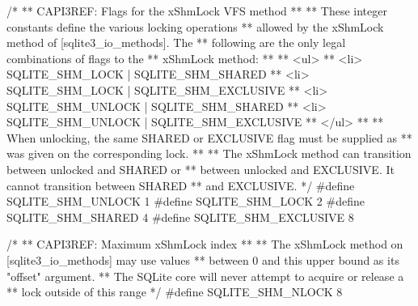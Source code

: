 \begin{Codex}[label=sqlite3.h,numbers=left]
{/*
** CAPI3REF: Flags for the xShmLock VFS method
**
** These integer constants define the various locking operations
** allowed by the xShmLock method of [sqlite3_io_methods].  The
** following are the only legal combinations of flags to the
** xShmLock method:
**
** <ul>
** <li>  SQLITE_SHM_LOCK | SQLITE_SHM_SHARED
** <li>  SQLITE_SHM_LOCK | SQLITE_SHM_EXCLUSIVE
** <li>  SQLITE_SHM_UNLOCK | SQLITE_SHM_SHARED
** <li>  SQLITE_SHM_UNLOCK | SQLITE_SHM_EXCLUSIVE
** </ul>
**
** When unlocking, the same SHARED or EXCLUSIVE flag must be supplied as
** was given on the corresponding lock.  
**
** The xShmLock method can transition between unlocked and SHARED or
** between unlocked and EXCLUSIVE.  It cannot transition between SHARED
** and EXCLUSIVE.
*/
#define SQLITE_SHM_UNLOCK       1
#define SQLITE_SHM_LOCK         2
#define SQLITE_SHM_SHARED       4
#define SQLITE_SHM_EXCLUSIVE    8

/*
** CAPI3REF: Maximum xShmLock index
**
** The xShmLock method on [sqlite3_io_methods] may use values
** between 0 and this upper bound as its "offset" argument.
** The SQLite core will never attempt to acquire or release a
** lock outside of this range
*/
#define SQLITE_SHM_NLOCK        8


}
\end{Codex}
